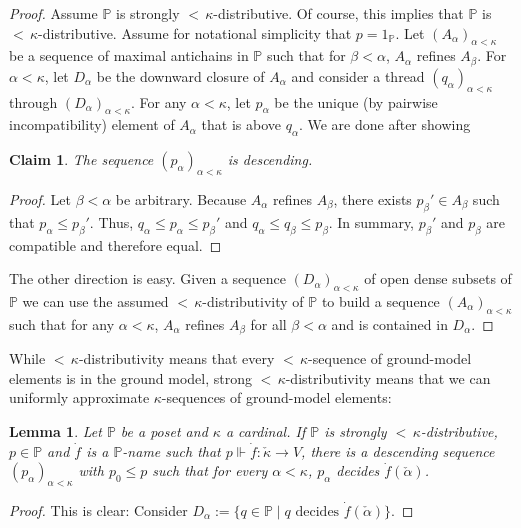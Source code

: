 \documentclass[12pt]{amsart}
\theoremstyle{definition}
\theoremstyle{remark}
\theoremstyle{plain}
\newtheorem{mylem}[mydef]{Lemma}
\newtheorem{myclaim}{Claim}
\numberwithin{mydef}{section}
\newcommand{\dP}{\mathbb{P}}
\begin{document}
	\begin{proof}
		Assume $\dP$ is strongly ${<}\,\kappa$-distributive. Of course, this implies that $\dP$ is ${<}\,\kappa$-distributive. Assume for notational simplicity that $p=1_{\dP}$. Let $(A_{\alpha})_{\alpha<\kappa}$ be a sequence of maximal antichains in $\dP$ such that for $\beta<\alpha$, $A_{\alpha}$ refines $A_{\beta}$. For $\alpha<\kappa$, let $D_{\alpha}$ be the downward closure of $A_{\alpha}$ and consider a thread $(q_{\alpha})_{\alpha<\kappa}$ through $(D_{\alpha})_{\alpha<\kappa}$. For any $\alpha<\kappa$, let $p_{\alpha}$ be the unique (by pairwise incompatibility) element of $A_{\alpha}$ that is above $q_{\alpha}$. We are done after showing
		\begin{myclaim}
			The sequence $(p_{\alpha})_{\alpha<\kappa}$ is descending.
		\end{myclaim}
		\begin{proof}
			Let $\beta<\alpha$ be arbitrary. Because $A_{\alpha}$ refines $A_{\beta}$, there exists $p_{\beta}'\in A_{\beta}$ such that $p_{\alpha}\leq p_{\beta}'$. Thus, $q_{\alpha}\leq p_{\alpha}\leq p_{\beta}'$ and $q_{\alpha}\leq q_{\beta}\leq p_{\beta}$. In summary, $p_{\beta}'$ and $p_{\beta}$ are compatible and therefore equal.
		\end{proof}
		The other direction is easy. Given a sequence $(D_{\alpha})_{\alpha<\kappa}$ of open dense subsets of $\dP$ we can use the assumed ${<}\,\kappa$-distributivity of $\dP$ to build a sequence $(A_{\alpha})_{\alpha<\kappa}$ such that for any $\alpha<\kappa$, $A_{\alpha}$ refines $A_{\beta}$ for all $\beta<\alpha$ and is contained in $D_{\alpha}$.
	\end{proof}
	
	While ${<}\,\kappa$-distributivity means that every ${<}\,\kappa$-sequence of ground-model elements is in the ground model, strong ${<}\,\kappa$-distributivity means that we can uniformly approximate $\kappa$-sequences of ground-model elements:
	
	\begin{mylem}\label{UniformDecision}
		Let $\dP$ be a poset and $\kappa$ a cardinal. If $\dP$ is strongly ${<}\,\kappa$-distributive, $p\in\dP$ and $\dot{f}$ is a $\dP$-name such that $p\Vdash\dot{f}:\check{\kappa}\longrightarrow V$, there is a descending sequence $(p_{\alpha})_{\alpha<\kappa}$ with $p_0\leq p$ such that for every $\alpha<\kappa$, $p_{\alpha}$ decides $\dot{f}(\check{\alpha})$.
	\end{mylem}
	
	\begin{proof}
		This is clear: Consider $D_{\alpha}:=\{q\in\dP\;|\;q\text{ decides }\dot{f}(\check{\alpha})\}$.
	\end{proof}
	
\end{document}
